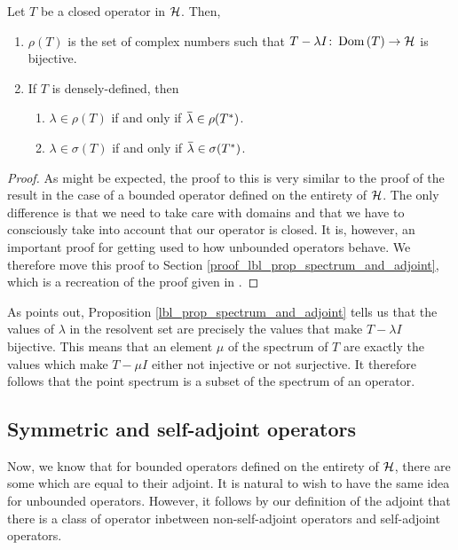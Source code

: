 \begin{proposition}\label{lbl_prop_spectrum_and_adjoint}
  Let $T$ be a closed operator in $\mathcal{H}$. Then,
    \begin{enumerate}[label = (\alph*)]
      \item $\rho(T)$ is the set of complex numbers such that $T - \lambda I \colon \operatorname{Dom}\left(T\right) \to \mathcal{H}$ is bijective.
      \item If $T$ is densely-defined, then
      \begin{enumerate}[label = (\roman*)]
        \item $\lambda \in \rho(T)$ if and only if $\conjugate{\lambda} \in \rho(T^*)$.
        \item $\lambda \in \sigma(T)$  if and only if $\conjugate{\lambda} \in \sigma(T^*)$.
      \end{enumerate}
  \end{enumerate}
\end{proposition}
\begin{proof}
  As might be expected, the proof to this is very similar to the proof of the result in the case of a bounded operator defined on the entirety of $\mathcal{H}$. The only difference is that we need to take care with domains and that we have to consciously take into account that our operator is closed. It is, however, an important proof for getting used to how unbounded operators behave. We therefore move this proof to Section \eqref{proof_lbl_prop_spectrum_and_adjoint}, which is a recreation of the proof given in {\cite[Proposition 2.7]{konrad}}.
\end{proof}

\begin{remark}
  As {\cite[p.30]{konrad}} points out, Proposition \eqref{lbl_prop_spectrum_and_adjoint} tells us that the values of $\lambda$ in the resolvent set are precisely the values that make $T - \lambda I$ bijective. This means that an element $\mu$ of the spectrum of $T$ are exactly the values which make $T - \mu I$ either not injective or not surjective. It therefore follows that the point spectrum is a subset of the spectrum of an operator.
\end{remark}

\subsection{Symmetric and self-adjoint operators}

Now, we know that for bounded operators defined on the entirety of $\mathcal{H}$, there are some which are equal to their adjoint. It is natural to wish to have the same idea for unbounded operators. However, it follows by our definition of the adjoint that there is a class of operator inbetween non-self-adjoint operators and self-adjoint operators.

